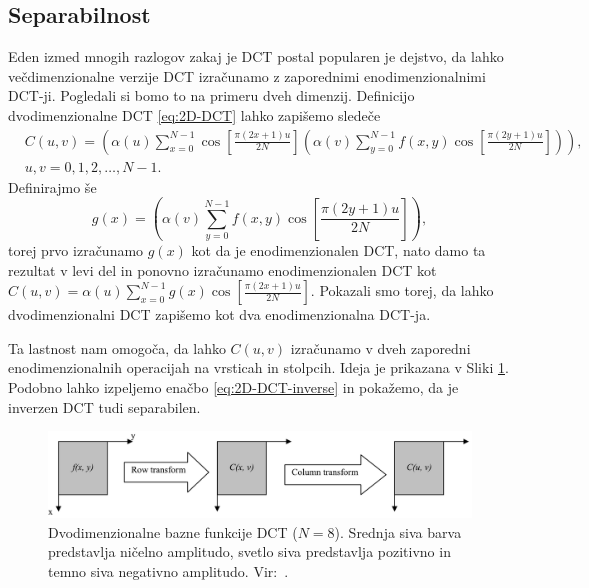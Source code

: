 \documentclass[a4paper,12pt,openright]{book}
\begin{document}
\subsection{Separabilnost} \label{Separabilnost}%
Eden izmed mnogih razlogov zakaj je DCT postal popularen je dejstvo, da lahko večdimenzionalne verzije DCT izračunamo z zaporednimi enodimenzionalnimi DCT-ji. Pogledali si bomo to na primeru dveh dimenzij. Definicijo dvodimenzionalne DCT \eqref{eq:2D-DCT} lahko zapišemo sledeče
\begin{equation}
    \begin{aligned}
    &C(u,v) = \left(\alpha(u)  \sum_{x=0}^{N-1}\cos\left[\frac{\pi(2x+1)u}{2N}\right]
              \left(\alpha(v)  \sum_{y=0}^{N-1} f(x,y)\cos\left[\frac{\pi(2y+1)u}{2N}\right]\right)\right), \\
    &u,v = 0,1,2,\ldots,N-1.
    \end{aligned}
\label{eq:2D-DCT_Separabilnost}
\end{equation}
Definirajmo še
\begin{equation*}
    g(x) = \left(\alpha(v)  \sum_{y=0}^{N-1} f(x,y)\cos\left[\frac{\pi(2y+1)u}{2N}\right]\right),
\end{equation*}
torej prvo izračunamo $g(x)$ kot da je enodimenzionalen DCT, nato damo ta rezultat v levi del in ponovno izračunamo enodimenzionalen DCT kot $C(u,v) = \alpha(u)  \sum_{x=0}^{N-1}g(x)\cos\left[\frac{\pi(2x+1)u}{2N}\right]$. Pokazali smo torej, da lahko dvodimenzionalni DCT zapišemo kot dva enodimenzionalna DCT-ja.\par
Ta lastnost nam omogoča, da lahko $C(u,v)$ izračunamo v dveh zaporedni enodimenzionalnih operacijah na vrsticah in stolpcih. Ideja je prikazana v Sliki \ref{Prikaz_separabilnosti}. Podobno lahko izpeljemo enačbo \eqref{eq:2D-DCT-inverse} in pokažemo, da je inverzen DCT tudi separabilen.\par


\begin{figure}[ht] %
\begin{center}
\includegraphics[width=1\textwidth]{slike/Prikaz_Separabilnosti.pdf}
\end{center}
\caption{Dvodimenzionalne bazne funkcije DCT ($N=8$). Srednja siva barva predstavlja ničelno amplitudo, svetlo siva predstavlja pozitivno in temno siva negativno amplitudo. Vir:~\cite{DCT_article}.}
\label{Prikaz_separabilnosti}
\end{figure}
\end{document}
